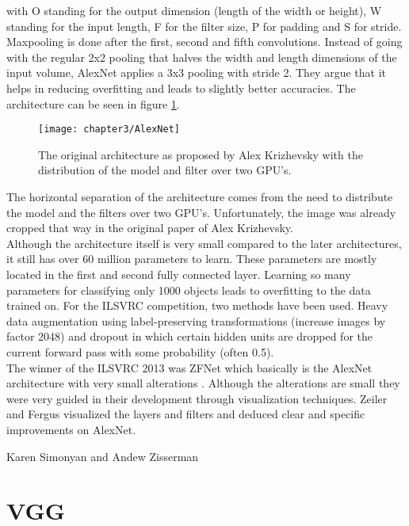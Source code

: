 with O standing for the output dimension (length of the width or height), W standing for the input length, F for the filter size, P for padding and S for stride. Maxpooling is done after the first, second and fifth convolutions. Instead of going with the regular 2x2 pooling that halves the width and length dimensions of the input volume, AlexNet applies a 3x3 pooling with stride 2. They argue that it helps in reducing overfitting and leads to slightly better accuracies. The architecture can be seen in figure \ref{fig:AlexNet}. \\

\begin{figure}[H]
  \centering
  \caption{The original architecture as proposed by Alex Krizhevsky with the distribution of the model and filter over two GPU's. \cite{krizhevsky2012imagenet}}
  \texttt{[image: chapter3/AlexNet]}
  \label{fig:AlexNet}
\end{figure}

The horizontal separation of the architecture comes from the need to distribute the model and the filters over two GPU's. Unfortunately, the image was already cropped that way in the original paper of Alex Krizhevsky. \\

Although the architecture itself is very small compared to the later architectures, it still has over 60 million parameters to learn. These parameters are mostly located in the first and second fully connected layer. Learning so many parameters for classifying only 1000 objects leads to overfitting to the data trained on. For the ILSVRC competition, two methods have been used. Heavy data augmentation using label-preserving transformations (increase images by factor 2048) and dropout in which certain hidden units are dropped for the current forward pass with some probability (often 0.5). \\

The winner of the ILSVRC 2013 was ZFNet which basically is the AlexNet architecture with very small alterations \cite{zeiler2014visualizing}. Although the alterations are small they were very guided in their development through visualization techniques. Zeiler and Fergus visualized the layers and filters and deduced clear and specific improvements on AlexNet.

Karen Simonyan and Andew Zisserman

\section{VGG}

